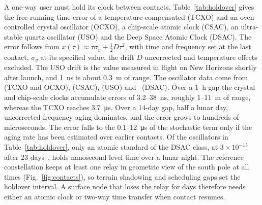 \documentclass{IEEEoj}
\begin{document}
A one-way user must hold its clock between contacts. Table~\ref{tab:holdover} gives the free-running time error of a temperature-compensated (TCXO) and an oven-controlled crystal oscillator (OCXO), a chip-scale atomic clock (CSAC), an ultra-stable quartz oscillator (USO) and the Deep Space Atomic Clock (DSAC). The error follows from $x(\tau)\approx \tau\sigma_y + \tfrac12 D\tau^2$, with time and frequency set at the last contact, $\sigma_y$ at its specified value, the drift $D$ uncorrected and temperature effects excluded. The USO drift is the value measured in flight on New Horizons shortly after launch, and \SI{1}{ns} is about \SI{0.3}{m} of range. The oscillator data come from~\cite{vig_tutorial} (TCXO and OCXO), \cite{microchip_csac} (CSAC), \cite{enzer2013,weaver2016} (USO) and~\cite{burt2021} (DSAC). Over a \SI{1}{h} gap the crystal and chip-scale clocks accumulate errors of \SI{3.2}{}--\SI{38}{ns}, roughly \SI{1}{}--\SI{11}{m} of range, whereas the TCXO reaches \SI{3.7}{\micro\second}. Over a 14-day gap, half a lunar day, uncorrected frequency aging dominates, and the error grows to hundreds of microseconds. The error falls to the \SI{0.1}{}--\SI{12}{\micro\second} of the stochastic term only if the aging rate has been estimated over earlier contacts. Of the oscillators in Table~\ref{tab:holdover}, only an atomic standard of the DSAC class, at $3\times10^{-15}$ after 23 days~\cite{burt2021}, holds nanosecond-level time over a lunar night. The reference constellation keeps at least one relay in geometric view of the south pole at all times (Fig.~\ref{fig:contacts}), so terrain shadowing and scheduling gaps set the holdover interval. A surface node that loses the relay for days therefore needs either an atomic clock or two-way time transfer when contact resumes.
\end{document}
